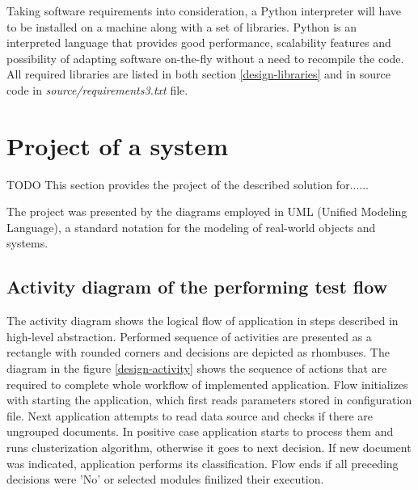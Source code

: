 Taking software requirements into consideration, a Python interpreter will have to be installed on a machine along with a set of libraries. Python is an interpreted language that provides good performance, scalability features and possibility of adapting software on-the-fly without a need to recompile the code. All required libraries are listed in both section \ref{design-libraries} and in source code in \textit{source/requirements3.txt} file.
 
 
\section{Project of a system} \label{project}
TODO
This section provides the project of the described solution for......

 The project was presented by the diagrams employed in UML (Unified Modeling Language), a standard notation for the modeling of real-world objects and systems. 
 
\subsection{Activity diagram of the performing test flow}
The activity diagram shows the logical flow of application in steps described in high-level abstraction. Performed sequence of activities are presented as a rectangle with rounded corners and decisions are depicted as rhombuses. The diagram in the figure \ref{design-activity} shows the sequence of actions that are required to complete whole workflow of implemented application. Flow initializes with starting the application, which first reads parameters stored in configuration file. Next application attempts to read data source and checks if there are ungrouped documents. In positive case application starts to process them and runs clusterization algorithm, otherwise it goes to next decision. If new document was indicated, application performs its classification.  Flow ends if all preceding decisions were 'No' or selected modules finilized their execution.

